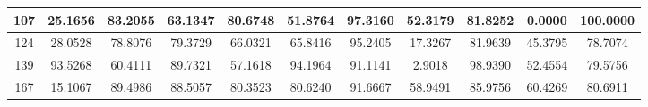 \begin{appendices}
\begin{table}
\begin{tabular}{ |c|c|c|c|c|c|c|c|c|c|c| }
\hline
107 & 25.1656 &  83.2055 &   63.1347 &  80.6748 &   51.8764 &  97.3160 &   52.3179 &  81.8252 &   0.0000 &  100.0000 \\
\hline
124 & 28.0528 &  78.8076 &   79.3729 &  66.0321 &   65.8416 &  95.2405 &   17.3267 &  81.9639 &   45.3795 &  78.7074 \\
\hline
139 & 93.5268 &  60.4111 &   89.7321 &  57.1618 &   94.1964 &  91.1141 &   2.9018 &  98.9390 &   52.4554 &  79.5756 \\
\hline
167 & 15.1067 &  89.4986 &   88.5057 &  80.3523 &   80.6240 &  91.6667 &   58.9491 &  85.9756 &   60.4269 &  80.6911 \\
\hline
\end{tabular}

\end{table}


\end{appendices}
